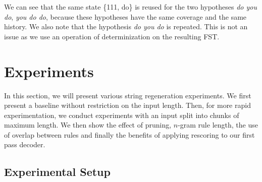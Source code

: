 %
We can see that the same state \{111, do\} is reused for
the two hypotheses \emph{do you do}, \emph{you do do}, because
these hypotheses have the same coverage and the same history.
We also note that the hypothesis \emph{do you do} is repeated.
This is not an issue as we use an operation of determinization
on the resulting FST.

\section{Experiments}

In this section, we will present various
string regeneration experiments.  We first present
a baseline without restriction on the input length.
Then, for more rapid experimentation, we conduct
experiments with an input split into chunks of maximum length.
We then show the effect of pruning, $n$-gram rule
length, the use of overlap between rules and finally
the benefits of applying rescoring to our first
pass decoder.

\subsection{Experimental Setup}

